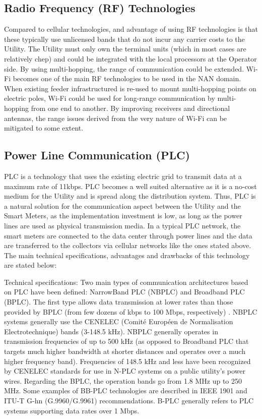 \documentclass[11pt,draftclsnofoot,onecolumn]{IEEEtran}
\begin{document}
\subsection{Radio Frequency (RF) Technologies}

Compared to cellular technologies, and advantage of using RF technologies is that these typically use unlicensed bands that do not incur any carrier costs to the Utility. The Utility must only own the terminal units (which in most cases are relatively chep) and could be integrated with the local processors at the Operator side. By using multi-hopping, the range of communication could be extended. Wi-Fi becomes one of the main RF technologies to be used in the NAN domain. When existing feeder infrastructured is re-used to mount multi-hopping points on electric poles, Wi-Fi could be used for long-range communication by multi-hopping from one end to another. By improving receivers and directional antennas, the range issues derived from the very nature of Wi-Fi can be mitigated to some extent.


\subsection{Power Line Communication (PLC)}\label{plc}

PLC is a technology that uses the existing electric grid to transmit data at a maximum rate of 11kbps. PLC becomes a well suited alternative as it is a no-cost medium for the Utility and is spread along the distribution system. Thus, PLC is a natural solution for the communication aspect between the Utility and the Smart Meters, as the implementation investment is low, as long as the power lines are used as physical transmission media.
In a typical PLC network, the smart meters are connected to the data center through power lines and the data are transferred to the collectors via cellular networks like the ones stated above. 
The main technical specifications, advantages and drawbacks of this technology are stated below:

Technical specifications: Two main types of communication architectures based on PLC have been defined: NarrowBand PLC (NBPLC) and Broadband PLC (BPLC). The first type allows data transmission at lower rates than those provided by BPLC (from few dozens of kbps to 100 Mbps, respectively) \cite{Sabbah2014}. NBPLC systems generally use the CENELEC (Comité Européen de Normalisation Electrotechnique) bands (3-148.5 kHz). NBPLC generally operates in transmission frequencies of up to 500 kHz (as opposed to Broadband PLC that targets much higher bandwidth at shorter distances and operates over a much higher frequency band). Frequencies of 148.5 kHz and less have been recognized by CENELEC standards for use in N-PLC systems on a public utility’s power wires. Regarding the BPLC, the operation bands go from 1.8 MHz up to 250 MHz. Some examples of BB-PLC technologies are described in IEEE 1901 and ITU-T G-hn (G.9960/G.9961) recommendations. B-PLC generally refers to PLC systems supporting data rates over 1 Mbps.
\end{document}
